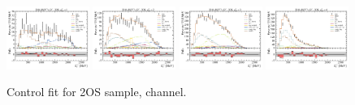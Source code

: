 \begin{figure}[htb]
    \includegraphics[width=0.24\textwidth]{./figs-fit-fit-results/ctrl-fit/lines_q2_slices/fit_result-lines_q2_idx1-Dst-2os-el.pdf}
    \includegraphics[width=0.24\textwidth]{./figs-fit-fit-results/ctrl-fit/lines_q2_slices/fit_result-lines_q2_idx2-Dst-2os-el.pdf}
    \includegraphics[width=0.24\textwidth]{./figs-fit-fit-results/ctrl-fit/lines_q2_slices/fit_result-lines_q2_idx3-Dst-2os-el.pdf}
    \includegraphics[width=0.24\textwidth]{./figs-fit-fit-results/ctrl-fit/lines_q2_slices/fit_result-lines_q2_idx4-Dst-2os-el.pdf}

    \caption{Control fit for 2OS sample, \Dstar channel.}
    \label{fig:ctrl-2os-dst}
\end{figure}

